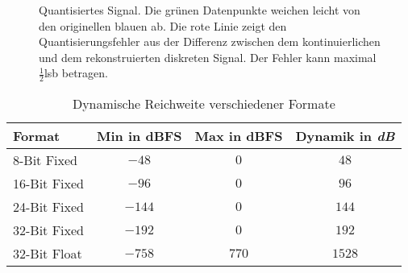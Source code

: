 \begin{figure}[]
    \centering
    \caption[Quantisiertes Signal]{Quantisiertes Signal. Die grünen Datenpunkte weichen leicht von den originellen blauen ab. Die rote Linie zeigt den Quantisierungsfehler aus der Differenz zwischen dem kontinuierlichen und dem rekonstruierten diskreten Signal. Der Fehler kann maximal $\frac{1}{2}$\gls{lsb} betragen.}
    \label{fig:quantized-signal}
\end{figure}

\begin{table}[]
    \centering
    \caption[Dynamische Reichweite verschiedener Formate]{Dynamische Reichweite verschiedener Formate}
    \vspace*{11pt}
    \begin{tabular}{lccc}
        \hline
        \textbf{Format} & \textbf{Min} in \gls{dBFS} & \textbf{Max} in \gls{dBFS} & \textbf{Dynamik} in \textit{dB} \\ \hline \hline
        8-Bit Fixed & $-48$ & $0$ & $48$ \\ \hline
        16-Bit Fixed & $-96$ & $0$ & $96$ \\ \hline
        24-Bit Fixed & $-144$ & $0$ & $144$ \\ \hline
        32-Bit Fixed & $-192$ & $0$ & $192$ \\ \hline
        32-Bit Float & $-758$ & $770$ & $1528$ \\ \hline
    \end{tabular}
    \label{tab:dynamic-range}
\end{table}

